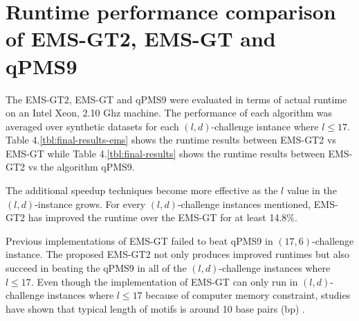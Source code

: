 	



\section{Runtime performance comparison of EMS-GT2, EMS-GT and qPMS9}
The EMS-GT2, EMS-GT and qPMS9 were evaluated in terms of actual runtime on an Intel Xeon, 2.10 Ghz machine. The performance of each algorithm was averaged over synthetic datasets for each $(l, d)$-challenge isntance where $l \leq 17$. Table 4.\ref{tbl:final-results-ems} shows the runtime results between EMS-GT2 vs EMS-GT while Table 4.\ref{tbl:final-results} shows the runtime results between EMS-GT2 vs the algorithm qPMS9.




The additional speedup techniques become more effective as the $l$ value in the $(l, d)$-instance grows. For every $(l, d)$-challenge instances mentioned, EMS-GT2 has improved the runtime over the EMS-GT for at least 14.8\%. 



Previous implementations of EMS-GT failed to beat qPMS9 in $(17, 6)$-challenge instance. The proposed EMS-GT2 not only produces improved runtimes but also succeed in beating the qPMS9 in all of the $(l, d)$-challenge instances where $l \leq 17$. Even though the implementation of EMS-GT can only run in $(l, d)$-challenge instances where $l \leq 17$ because of computer memory constraint, studies have shown that typical length of motifs is around 10 base pairs (bp) \cite{stewart2012transcription}.





